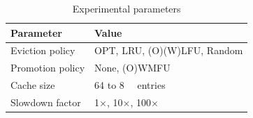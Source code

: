 \begin{table}[t]
\small {
	\centering
	\caption{Experimental parameters}
	\label{tab:setup}
	\begin{tabular}{l|l}
		\toprule
		\textbf{Parameter}       & \textbf{Value}   \\
		\midrule
		Eviction policy            & OPT, LRU, (O)(W)LFU, Random			    \\
		Promotion policy            & None, (O)WMFU			    \\
		Cache size              & 64 to \SI{8}{\kilo\nothing} entries  \\
		Slowdown factor         & 1$\times$, 10$\times$, 100$\times$        \\
		\bottomrule
	\end{tabular}
}
\end{table}

